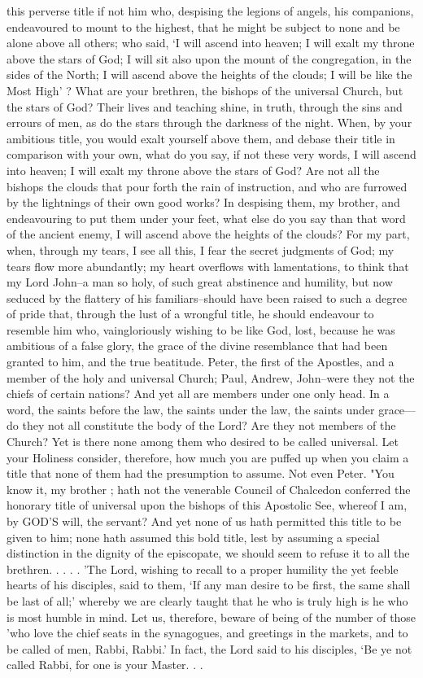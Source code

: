 this perverse title if not him who, despising the legions of angels, his companions, endeavoured to mount to the highest, that he might be subject to none and be alone above all others; who said, ‘I will ascend into heaven; I will exalt my throne above the stars of God; I will sit also upon the mount of the congregation, in the sides of the North; I will ascend above the heights of the clouds; I will be like the Most High' ? What are your brethren, the bishops of the universal Church, but the stars of God? Their lives and teaching shine, in truth, through the sins and errours of men, as do the stars through the darkness of the night. When, by your ambitious title, you would exalt yourself above them, and debase their title in comparison with your own, what do you say, if not these very words, I will ascend into heaven; I will exalt my throne above the stars of God? Are not all the bishops the clouds that pour forth the rain of instruction, and who are furrowed by the lightnings of their own good works? In despising them, my brother, and endeavouring to put them under your feet, what else do you say than that word of the ancient enemy, I will ascend above the heights of the clouds? For my part, when, through my tears, I see all this, I fear the secret judgments of God; my tears flow more abundantly; my heart overflows with lamentations, to think that my Lord John--a man so holy, of such great abstinence and humility, but now seduced by the flattery of his familiars--should have been raised to such a degree of pride that, through the lust of a wrongful title, he should endeavour to resemble him who, vaingloriously wishing to be like God, lost, because he was ambitious of a false glory, the grace of the divine resemblance that had been granted to him, and the true beatitude. Peter, the first of the Apostles, and a member of the holy and universal Church; Paul, Andrew, John--were they not the chiefs of certain nations? And yet all are members under one only head. In a word, the saints before the law, the saints under the law, the saints under grace—do they not all constitute the body of the Lord? Are they not members of the Church? Yet is there none among them who desired to be called universal. Let your Holiness consider, therefore, how much you are puffed up when you claim a title that none of them had the presumption to assume. Not even Peter. "You know it, my brother ; hath not the venerable Council of Chalcedon conferred the honorary title of universal upon the bishops of this Apostolic See, whereof I am, by GOD’S will, the servant? And yet none of us hath permitted this title to be given to him; none hath assumed this bold title, lest by assuming a special distinction in the dignity of the episcopate, we should seem to refuse it to all the brethren. . . . . 'The Lord, wishing to recall to a proper humility the yet feeble hearts of his disciples, said to them, ‘If any man desire to be first, the same shall be last of all;' whereby we are clearly taught that he who is truly high is he who is most humble in mind. Let us, therefore, beware of being of the number of those 'who love the chief seats in the synagogues, and greetings in the markets, and to be called of men, Rabbi, Rabbi.' In fact, the Lord said to his disciples, ‘Be ye not called Rabbi, for one is your Master. . . 